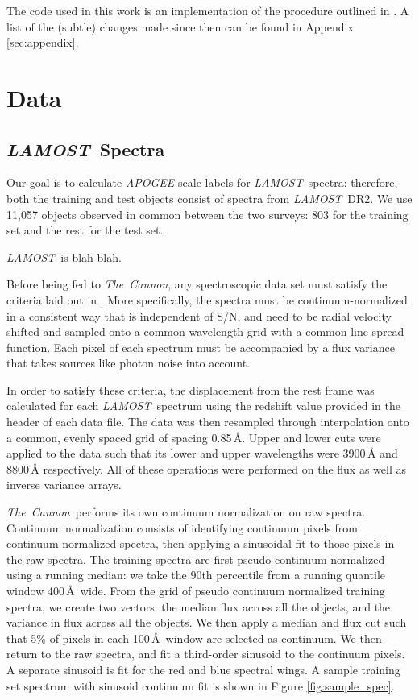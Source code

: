 \documentclass[12pt, preprint]{aastex}
\newcommand{\tc}{\textsl{The~Cannon}}
\newcommand{\apogee}{\textsl{APOGEE}}
\newcommand{\lamost}{\textsl{LAMOST}}
\begin{document}
The code used in this work is an implementation of the procedure outlined in 
\citep{ness2015}. A list of the (subtle) changes made since then
can be found in Appendix \ref{sec:appendix}.

\section{Data}

\subsection{\lamost\ Spectra}

Our goal is to calculate \apogee-scale labels for \lamost\ spectra: 
therefore, both the training and test objects consist of spectra from
\lamost\ DR2. We use 11,057 objects observed in common between
the two surveys: 803 for the training set and the rest for the test set. 

\lamost\ is blah blah. 

Before being fed to \tc, any spectroscopic data set must satisfy the criteria laid out in 
\citet{ness2015}. More specifically, the spectra must be
continuum-normalized in a consistent way that is independent of S/N, and need
to be radial velocity shifted and sampled onto a common wavelength grid with
a common line-spread function. Each pixel of each spectrum must be accompanied
by a flux variance that takes sources like photon noise into account. 

In order to satisfy these criteria, the displacement from the rest frame was
calculated for each \lamost\ spectrum using the redshift value provided in 
the header of each data file. The data was then resampled through interpolation
onto a common, evenly spaced grid of spacing 0.85\,$\mbox{\AA}$. 
Upper and lower cuts were applied to the data such that its lower and upper 
wavelengths were 3900\,$\mbox{\AA}$ and 8800\,$\mbox{\AA}$ respectively.
All of these operations were performed on the flux as well as inverse variance
arrays. 

\tc\ performs its own continuum normalization on raw spectra. 
Continuum normalization consists of identifying continuum pixels from continuum
normalized spectra, then applying a sinusoidal fit to those pixels in the raw spectra.
The training spectra are first pseudo continuum normalized using a running median: 
we take the 90th percentile from a running quantile window 400\,\AA\ wide. 
From the grid of pseudo continuum normalized training spectra, we create two vectors: 
the median flux across all the objects, and the variance in flux across all the objects. 
We then apply a median and flux cut such that 5\% of pixels in each 100\,\AA\ window
are selected as continuum. We then return to the raw spectra, and fit a third-order 
sinusoid to the continuum pixels. A separate sinusoid is fit for the red and blue spectral
wings. A sample training set spectrum with sinusoid continuum fit is shown in
Figure \ref{fig:sample_spec}. 
\end{document}
